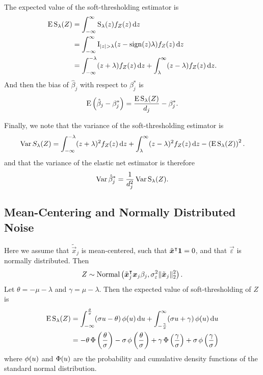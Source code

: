 The expected value of the soft-thresholding estimator is
\begin{equation}
  \label{eq:st-expected-value}
  \begin{aligned}
    \operatorname{E} \operatorname{S}_\lambda(Z) & = \int_{-\infty}^\infty \operatorname{S}_\lambda(z) f_Z(z) \mathop{}\!\mathrm{d} z                                                     \\
                      & = \int_{-\infty}^\infty \operatorname{I}_{|z| > \lambda} (z -\operatorname{sign}(z)\lambda) f_Z(z) \mathop{}\!\mathrm{d} z                           \\
                      & = \int_{-\infty}^{-\lambda}(z + \lambda)f_Z(z) \mathop{}\!\mathrm{d} z + \int_{\lambda}^\infty (z - \lambda)f_Z(z) \mathop{}\!\mathrm{d} z.
  \end{aligned}
\end{equation}
And then the bias of \(\hat\beta_j\) with respect to \(\beta_j^*\) is
\begin{equation}
  \label{eq:betahat-bias}
  \operatorname{E} \left( \hat\beta_j - \beta_j^* \right) = \frac{\operatorname{E} \operatorname{S}_\lambda(Z)}{d_j} - \beta^*_j.
\end{equation}

Finally, we note that the variance of the soft-thresholding estimator is
\begin{equation}
  \label{eq:st-variance}
  \operatorname{Var} {S_\lambda(Z)} = \int_{-\infty}^{-\lambda}(z + \lambda)^2f_Z(z) \mathop{}\!\mathrm{d} z + \int_{\lambda}^\infty (z - \lambda)^2 f_Z(z) \mathop{}\!\mathrm{d} z - \left(\operatorname{E} \operatorname{S}_\lambda(Z)\right)^2.
\end{equation}
and that the variance of the elastic net estimator is therefore
\begin{equation}
  \label{eq:betahat-variance}
  \operatorname{Var} \hat\beta_j^* = \frac{1}{d_j^2} \operatorname{Var} \operatorname{S}_\lambda(Z).
\end{equation}

\subsection{Mean-Centering and Normally Distributed Noise}

Here we assume that \(\tilde{\vec{x}}_j\) is mean-centered, such that \(\tilde{\boldsymbol{x}}^\intercal \boldsymbol{1} = 0\), and that \(\vec{\varepsilon}\) is normally distributed. Then
\[
  Z \sim \operatorname{Normal}\left(\tilde{\boldsymbol{x}}_j^\intercal\boldsymbol{x}_j \beta_j, \sigma_\varepsilon^2 \lVert \tilde{\boldsymbol{x}}_j\rVert_2^2 \right).
\]
Let \(\theta = -\mu -\lambda \) and \(\gamma = \mu - \lambda\). Then the expected value of soft-thresholding of \(Z\) is
\begin{align}
  \operatorname{E} \operatorname{S}_\lambda(Z) & = \int_{-\infty}^\frac{\theta}{\sigma} (\sigma u - \theta) \operatorname{\phi}(u) \mathop{}\!\mathrm{d} u + \int_{-\frac{\gamma}{\sigma}}^\infty (\sigma u + \gamma) \operatorname{\phi}(u) \mathop{}\!\mathrm{d} u                                               \nonumber                      \\
                    & = -\theta \operatorname{\Phi}\left(\frac{\theta}{\sigma}\right) - \sigma \operatorname{\phi}\left(\frac{\theta}{\sigma}\right) + \gamma \operatorname{\Phi}\left(\frac{\gamma}{\sigma}\right) + \sigma \operatorname{\phi}\left(\frac{\gamma}{\sigma}\right) \label{eq:mean-centered-eval}
\end{align}
where \(\operatorname{\phi}(u)\) and \(\operatorname{\Phi}(u)\) are the probability and cumulative density functions of the standard normal distribution.


